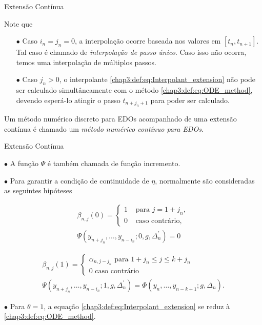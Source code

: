 \documentclass{beamer}
\theoremstyle{plain}
\theoremstyle{definition}
\begin{document}
\begin{frame}{Extensão Contínua}

    Note que

    \begin{itemize}
        \item[$\bullet$] Caso $i_n = j_n = 0$, a interpolação ocorre baseada nos valores em $[t_n, t_{n+1}]$. Tal caso é chamado de \textit{interpolação de passo único}. Caso isso não ocorra, temos uma interpolação de múltiplos passos. 
        \item[$\bullet$] Caso $j_{n} > 0$, o interpolante \eqref{chap3:def:eq:Interpolant_extension} não pode ser calculado simultâneamente com o método \eqref{chap3:def:eq:ODE_method}, devendo esperá-lo atingir o passo $t_{n + j_n + 1}$ para poder ser calculado.
    \end{itemize}


    Um método numérico discreto para EDOs acompanhado de uma extensão contínua é chamado um \textit{método numérico contínuo para EDOs}. 


\end{frame}



\begin{frame}{Extensão Contínua}

    \phantom{aa} $\bullet$ A função $\Psi$ é também chamada de função incremento. 

    \phantom{aa} $\bullet$ Para garantir a condição de continuidade de $\eta$, normalmente são consideradas as seguintes hipóteses

    \[
        \begin{gathered}
            \beta_{n, j}(0)= \begin{cases}1 & \text { para } j=1+j_{n}, \\
            0 & \text { caso contrário, }\end{cases} \\
            \Psi\left(y_{n+j_{n}}, \ldots, y_{n-i_{n}} ; 0, g, \Delta_{n}^{\prime}\right)=0
            \end{gathered}
    \]

    \[
        \begin{gathered}
            \beta_{n, j}(1)=\left\{\begin{array}{l}
                    \alpha_{n, j-j_{n}} \text { para } 1+j_{n} \leq j \leq k+j_{n} \\
                    0 \text { caso contrário }
            \end{array}\right. \\
            \Psi\left(y_{n+j_{n}}, \ldots, y_{n-i_{n}} ; 1, g, \Delta_{n}^{\prime}\right)=\Phi\left(y_{n}, \ldots, y_{n-k+1} ; g, \Delta_{n}\right).
        \end{gathered}
    \]


        \phantom{aa} $\bullet$ Para $\theta=1$, a equação \eqref{chap3:def:eq:Interpolant_extension} se reduz à \eqref{chap3:def:eq:ODE_method}. 

    \end{frame}
\end{document}
